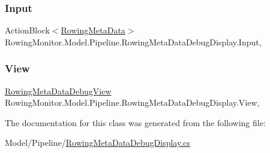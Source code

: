 \subsubsection{\texorpdfstring{Input}{Input}}
{\footnotesize\ttfamily Action\+Block$<$\hyperlink{struct_rowing_monitor_1_1_model_1_1_util_1_1_rowing_meta_data}{Rowing\+Meta\+Data}$>$ Rowing\+Monitor.\+Model.\+Pipeline.\+Rowing\+Meta\+Data\+Debug\+Display.\+Input\hspace{0.3cm}{\ttfamily [get]}, {\ttfamily [set]}}

\mbox{\label{class_rowing_monitor_1_1_model_1_1_pipeline_1_1_rowing_meta_data_debug_display_a7f1b6ca457ce19e755f5b6708cc7c930}} 
\subsubsection{\texorpdfstring{View}{View}}
{\footnotesize\ttfamily \hyperlink{class_rowing_monitor_1_1_view_1_1_rowing_meta_data_debug_view}{Rowing\+Meta\+Data\+Debug\+View} Rowing\+Monitor.\+Model.\+Pipeline.\+Rowing\+Meta\+Data\+Debug\+Display.\+View\hspace{0.3cm}{\ttfamily [get]}, {\ttfamily [set]}}



The documentation for this class was generated from the following file\+:\begin{DoxyCompactItemize}
\item 
Model/\+Pipeline/\hyperlink{_rowing_meta_data_debug_display_8cs}{Rowing\+Meta\+Data\+Debug\+Display.\+cs}\end{DoxyCompactItemize}
